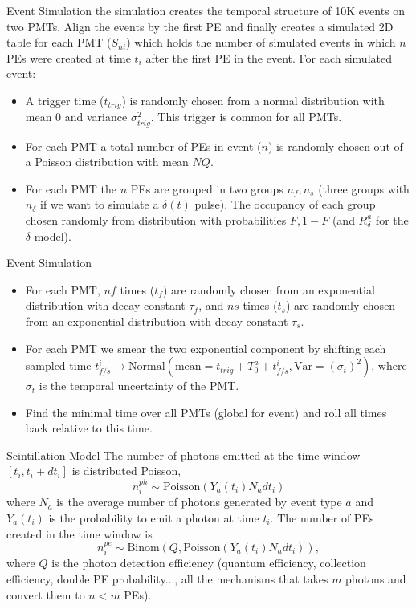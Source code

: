 \documentclass{beamer}
\begin{document}
\begin{frame}{Event Simulation}
the simulation creates the temporal structure of 10K events on two PMTs. Align the events by the first PE and finally creates a simulated 2D table for each PMT ($S_{ni}$) which holds the number of simulated events in which $n$ PEs were created at time $t_i$ after the first PE in the event. 
For each simulated event:
\begin{itemize}
\item A trigger time ($t_{trig}$) is randomly chosen from a normal distribution with mean 0 and variance $\sigma_{trig}^2$. This trigger is common for all PMTs.
\item For each PMT a total number of PEs in event ($n$) is randomly chosen out of a Poisson distribution with mean $NQ$.
\item For each PMT the $n$ PEs are grouped in two groups $n_f, n_s$ (three groups with $n_\delta$ if we want to simulate a $\delta(t)$ pulse). The occupancy of each group chosen randomly from distribution with probabilities $F, 1-F$ (and $R_\delta^a$ for the $\delta$ model). 
\end{itemize}
\end{frame}

\begin{frame}{Event Simulation}
\begin{itemize}
\item For each PMT, $nf$ times ($t_f$) are randomly chosen from an exponential distribution with decay constant $\tau_f$, and $ns$ times ($t_s$) are randomly chosen from an exponential distribution with decay constant $\tau_s$.
\item For each PMT we smear the two exponential component by shifting each sampled time $t_{f/s}^i\rightarrow \text{Normal}(\text{mean}=t_{trig}+T_0^a+t_{f/s}^i, \text{Var}=(\sigma_t)^2)$, where $\sigma_t$ is the temporal uncertainty of the PMT.
\item Find the minimal time over all PMTs (global for event) and roll all times back relative to this time.
\end{itemize}
\end{frame}

\begin{frame}{Scintillation Model}
The number of photons emitted at the time window $[t_i, t_i+dt_i]$ is distributed Poisson,
\begin{equation}
n_i^{ph}\sim\text{Poisson}(Y_a(t_i)N_adt_i)
\end{equation} 
where $N_a$ is the average number of photons generated by event type $a$ and $Y_a(t_i)$ is the probability to emit a photon at time $t_i$.
The number of PEs created in the time window is
\begin{equation}
n_i^{pe}\sim\text{Binom}(Q,\text{Poisson}(Y_a(t_i)N_adt_i)),
\end{equation}
where $Q$ is the photon detection efficiency (quantum efficiency, collection efficiency, double PE probability..., all the mechanisms that takes $m$ photons and convert them to $n<m$ PEs).
\end{frame}
\end{document}
